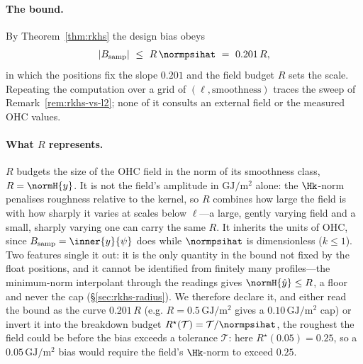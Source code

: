 \paragraph{The bound.}
By Theorem~\ref{thm:rkhs} the design bias obeys
\[
  |B_{\mathrm{samp}}|\ \le\ R\,\normpsihat\ =\ 0.201\,R ,
\]
in which the positions fix the slope $0.201$ and the field budget $R$ sets the
scale. Repeating the computation over a grid of $(\ell,\text{smoothness})$ traces
the sweep of Remark~\ref{rem:rkhs-vs-l2}; none of it consults an external field or
the measured OHC values.

\paragraph{What $R$ represents.}
$R$ budgets the size of the OHC field in the norm of its smoothness class,
$R=\normH{y}$. It is not the field's amplitude in $\mathrm{GJ/m^2}$ alone: the
$\Hk$-norm penalises roughness relative to the kernel, so $R$ combines how large
the field is with how sharply it varies at scales below $\ell$---a large, gently
varying field and a small, sharply varying one can carry the same $R$. It
inherits the units of OHC, since $B_{\mathrm{samp}}=\inner{y}{\psi}$ does while
$\normpsihat$ is dimensionless ($k\le1$). Two features single it out: it is the
only quantity in the bound not fixed by the float positions, and it cannot be
identified from finitely many profiles---the minimum-norm interpolant through the
readings gives $\normH{\hat y}\le R$, a floor and never the cap
(\S\ref{sec:rkhs-radius}). We therefore declare it, and either read the bound as
the curve $0.201\,R$ (e.g. $R=0.5\,\mathrm{GJ/m^2}$ gives a $0.10\,\mathrm{GJ/m^2}$
cap) or invert it into the breakdown budget
$R^{\star}(\mathcal T)=\mathcal T/\normpsihat$, the roughest the field could be
before the bias exceeds a tolerance $\mathcal T$: here $R^{\star}(0.05)=0.25$, so
a $0.05\,\mathrm{GJ/m^2}$ bias would require the field's $\Hk$-norm to exceed
$0.25$.
